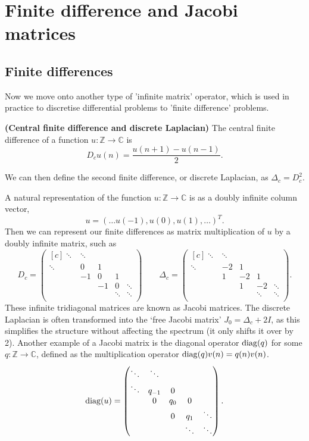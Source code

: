 \documentclass[../main.tex]{subfiles}
\begin{document}
\section{Finite difference and Jacobi matrices}

\subsection{Finite differences}
Now we move onto another type of 'infinite matrix' operator, which is used in
practice to discretise differential problems to 'finite difference' problems.\cite{suli2003introduction}

\begin{definition}{\textbf{(Central finite difference and discrete Laplacian)}}
  The central finite difference of a function $u: \mathbb{Z} \rightarrow
  \mathbb{C}$ is $$D_c u (n) = \frac{u(n+1) - u(n-1)}{2}.$$

  We can then define the second finite difference, or discrete Laplacian, as
  $\Delta_c = D_c^2$.
\end{definition}

A natural representation of the function $u: \mathbb{Z} \rightarrow \mathbb{C}$
is as a doubly infinite column vector, $$u = (\hdots u(-1), u(0), u(1),\hdots)^T.$$
Then we can represent our finite differences as matrix multiplication of $u$
by a doubly infinite matrix, such as
  $$ 
  D_c = 
  \begin{pmatrix*}[c]
    \ddots & \ddots & & & \\
    \ddots & 0 & 1 & & \\
    & -1 & 0 & 1 & \\
    & & -1 & 0 & \ddots \\
    & & & \ddots & \ddots \\
  \end{pmatrix*}
  \quad\quad
  \Delta_c = 
  \begin{pmatrix*}[c] 
    \ddots & \ddots & & & \\
    \ddots & -2 & 1 & & \\
    & 1 & -2 & 1 & \\
    & & 1 & -2 & \ddots \\
    & & & \ddots & \ddots \\
  \end{pmatrix*}. 
  $$
These infinite tridiagonal matrices are known as Jacobi matrices. The discrete
Laplacian is often transformed into the `free Jacobi matrix' $J_0 = \Delta_c +
2I$, as this simplifies the structure without affecting the spectrum (it only
shifts it over by 2). Another example of a Jacobi matrix is the diagonal
operator $\mathrm{diag}(q)$ for some $q: \mathbb{Z} \rightarrow \mathbb{C}$, defined as
the multiplication operator $\mathrm{diag}(q)v(n) = q(n)v(n)$.
  $$ 
  \diag(u) = 
  \begin{pmatrix*}[c]
    \ddots & \ddots & & & \\
    \ddots & q_{-1} & 0 & & \\
    & 0 & q_0 & 0 & \\
    & & 0 & q_1 & \ddots \\
    & & & \ddots & \ddots \\
  \end{pmatrix*}.
  $$
\end{document}
